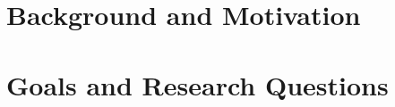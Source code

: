 \documentclass[a4paper]{book}
\begin{document}





\section{Background and Motivation}\label{cit}
\label{sec:BackgroundAndMotivation}







\section{Goals and Research Questions}
\label{sec:Goals and Research Questions}
\end{document}
